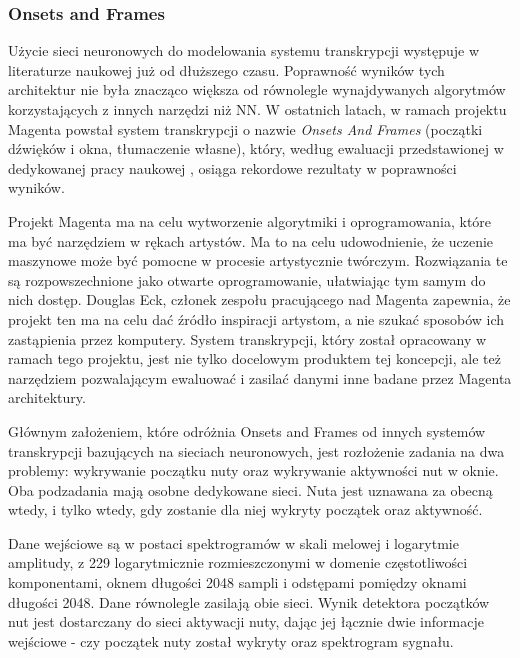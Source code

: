 \documentclass[12pt,a4paper,twoside]{mwart}
\begin{document}


\subsubsection{Onsets and Frames}\label{sec:multif0:onsetsAndFrames}
Użycie sieci neuronowych do modelowania systemu transkrypcji występuje w literaturze naukowej już od dłuższego czasu. Poprawność wyników tych architektur nie była znacząco większa od równolegle wynajdywanych algorytmów korzystających z innych narzędzi niż NN. W ostatnich latach, w ramach projektu Magenta \cite{Transcription:Magenta} powstał system transkrypcji o nazwie \textit{Onsets And Frames} (początki dźwięków i okna, tłumaczenie własne), który, według ewaluacji przedstawionej w dedykowanej pracy naukowej \cite{Transcription:Hawthorne:OnsetsAndFrames}, osiąga rekordowe rezultaty w poprawności wyników.

Projekt Magenta ma na celu wytworzenie algorytmiki i oprogramowania, które ma być narzędziem w rękach artystów. Ma to na celu udowodnienie, że uczenie maszynowe może być pomocne w procesie artystycznie twórczym. Rozwiązania te są rozpowszechnione jako otwarte oprogramowanie, ułatwiając tym samym do nich dostęp. Douglas Eck, członek zespołu pracującego nad Magenta zapewnia, że projekt ten ma na celu dać źródło inspiracji artystom, a nie szukać sposobów ich zastąpienia przez komputery. System transkrypcji, który został opracowany w ramach tego projektu, jest nie tylko docelowym produktem tej koncepcji, ale też narzędziem pozwalającym ewaluować i zasilać danymi inne badane przez Magenta architektury.

Głównym założeniem, które odróżnia Onsets and Frames od innych systemów transkrypcji bazujących na sieciach neuronowych, jest rozłożenie zadania na dwa problemy: wykrywanie początku nuty oraz wykrywanie aktywności nut w oknie. Oba pod\-zadania mają osobne dedykowane sieci. Nuta jest uznawana za obecną wtedy, i tylko wtedy, gdy zostanie dla niej wykryty początek oraz aktywność.

Dane wejściowe są w postaci spektrogramów w skali melowej i logarytmie amplitudy, z 229 logarytmicznie rozmieszczonymi w domenie częstotliwości komponentami, oknem długości 2048 sampli i odstępami pomiędzy oknami długości 2048. Dane równolegle zasilają obie sieci. Wynik detektora początków nut jest dostarczany do sieci aktywacji nuty, dając jej łącznie dwie informacje wejściowe - czy  początek nuty został wykryty oraz spektrogram sygnału.
\end{document}
